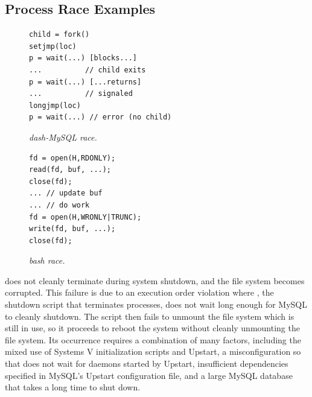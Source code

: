 \subsection{Process Race Examples} \label{racepro:sec:example}

\begin{figure}[t]
\small
\begin{minipage}{0.60\linewidth}
  \centering
\begin{verbatim}
child = fork()
setjmp(loc)
p = wait(...) [blocks...]
...          // child exits
p = wait(...) [...returns]
...          // signaled
longjmp(loc)
p = wait(...) // error (no child)
\end{verbatim}
    \caption{{\em dash-MySQL race.}} \label{racepro:fig:dash-mysql}
\end{minipage}
\begin{minipage}{0.39\linewidth}
    \centering
\begin{verbatim}
fd = open(H,RDONLY);
read(fd, buf, ...);
close(fd);
... // update buf
... // do work
fd = open(H,WRONLY|TRUNC);
write(fd, buf, ...);
close(fd);
\end{verbatim}
      \caption{{\em bash race.}} \label{racepro:fig:bash}
\end{minipage}
\end{figure}

   does not cleanly terminate
during system shutdown, and the file system becomes corrupted.  This
failure is due to an execution order violation where ,
the shutdown script that terminates processes, does not wait long
enough for MySQL to cleanly shutdown. The script then fails to unmount
the file system which is still in use, so it proceeds to reboot the
system without cleanly unmounting the file system.  Its occurrence
requires a combination of many factors, including the mixed use of
Systems V initialization scripts and Upstart, a misconfiguration so
that  does not wait for daemons started by Upstart,
insufficient dependencies specified in MySQL's Upstart configuration
file, and a large MySQL database that takes a long time to shut down.


